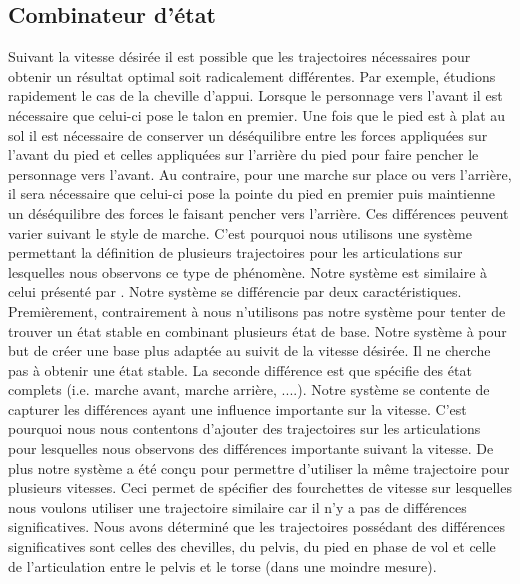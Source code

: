 \documentclass{llncs}
\begin{document}
\subsection{Combinateur d'état}
\label{sec:multi_state}
%
Suivant la vitesse désirée il est possible que les trajectoires nécessaires pour obtenir un résultat optimal soit radicalement différentes. Par exemple, étudions rapidement le cas de la cheville d'appui. Lorsque le personnage vers l'avant il est nécessaire que celui-ci pose le talon en premier. Une fois que le pied est à plat au sol il est nécessaire de conserver un déséquilibre entre les forces appliquées sur l'avant du pied et celles appliquées sur l'arrière du pied pour faire pencher le personnage vers l'avant. Au contraire, pour une marche sur place ou vers l'arrière, il sera nécessaire que celui-ci pose la pointe du pied en premier puis maintienne un déséquilibre des forces le faisant pencher vers l'arrière. Ces différences peuvent varier suivant le style de marche. C'est pourquoi nous utilisons une système permettant  la définition de plusieurs trajectoires pour les articulations sur lesquelles nous observons ce type de phénomène. Notre système est similaire à celui présenté par \cite{coros2009robust}. Notre système se différencie par deux caractéristiques. Premièrement, contrairement à \cite{coros2009robust} nous n'utilisons pas notre système pour tenter de trouver un état stable en combinant plusieurs état de base. Notre système à pour but de créer une base plus adaptée au suivit de la vitesse désirée. Il ne cherche pas à obtenir une état stable. La seconde différence est que \cite{coros2009robust} spécifie des état complets (i.e. marche avant, marche arrière, ....). Notre système se contente de capturer les différences ayant une influence importante sur la vitesse. C'est pourquoi nous nous contentons d'ajouter des trajectoires sur les articulations pour lesquelles nous observons des différences importante suivant la vitesse. De plus notre système a été conçu pour permettre d'utiliser la même trajectoire pour plusieurs vitesses. Ceci permet de spécifier des fourchettes de vitesse sur lesquelles nous voulons utiliser une trajectoire similaire car il n'y a pas de différences significatives. Nous avons déterminé que les trajectoires possédant des différences significatives sont celles des chevilles, du pelvis, du pied en phase de vol et celle de l'articulation entre le pelvis et le torse (dans une moindre mesure). 
\end{document}
